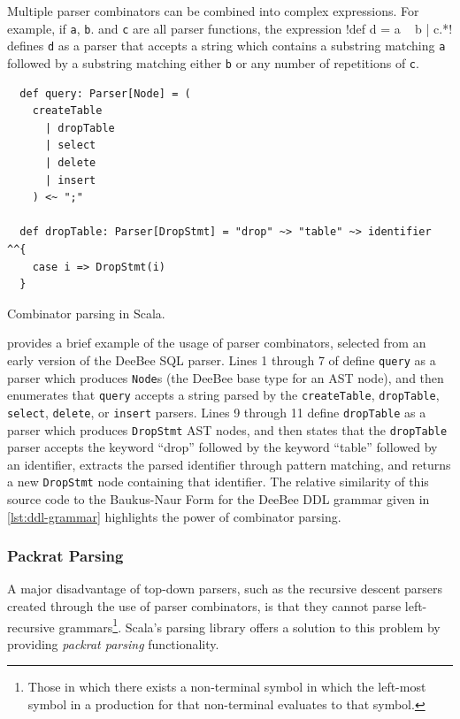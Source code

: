 Multiple parser combinators can be combined into complex expressions. For example, if \texttt{a}, \texttt{b}. and \texttt{c} are all parser functions, the expression !def d = a ~ b | c.*! defines \texttt{d} as a parser that accepts a string which contains a substring matching \texttt{a} followed by a substring matching either \texttt{b} or any number of repetitions of \texttt{c}. 

\begin{listing}[h]
    \begin{verbatim}
  def query: Parser[Node] = (
    createTable
      | dropTable
      | select
      | delete
      | insert
    ) <~ ";"
    
  def dropTable: Parser[DropStmt] = "drop" ~> "table" ~> identifier ^^{
    case i => DropStmt(i)
  }
    \end{verbatim}
    \caption{Combinator parsing in Scala.}
    \label{lst:parcoms}
\end{listing}

 provides a brief example of the usage of parser combinators, selected from an early version of the DeeBee SQL parser. Lines 1 through 7 of  define \texttt{query} as a parser which produces \texttt{Node}s (the DeeBee base type for an AST node), and then enumerates that \texttt{query} accepts a string parsed by the \texttt{createTable}, \texttt{dropTable}, \texttt{select}, \texttt{delete}, or \texttt{insert} parsers. Lines 9 through 11 define \texttt{dropTable} as a parser which produces \texttt{DropStmt} AST nodes, and then states that the \texttt{dropTable} parser accepts the keyword ``drop'' followed by the keyword ``table'' followed by an identifier, extracts the parsed identifier through pattern matching, and returns a new \texttt{DropStmt} node containing that identifier. The relative similarity of this source code to the Baukus-Naur Form for the DeeBee DDL grammar given in \cref{lst:ddl-grammar} highlights the power of combinator parsing.
\FloatBarrier

\subsubsection{Packrat Parsing}
A major disadvantage of top-down parsers, such as the recursive descent parsers created through the use of parser combinators, is that they cannot parse left-recursive grammars\footnote{Those in which there exists a non-terminal symbol in which the left-most symbol in a production for that non-terminal evaluates to that symbol.}. Scala's parsing library offers a solution to this problem by providing \textit{packrat parsing} functionality.

